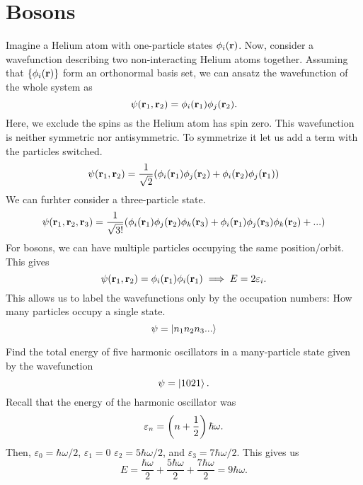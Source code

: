\section{Bosons}
    Imagine a Helium atom with one-particle states $\phi_i(\mathbf{r})$. Now, consider a wavefunction describing two non-interacting Helium atoms together. Assuming that $\{\phi_i(\mathbf{r})\}$ form an orthonormal basis set, we can ansatz the wavefunction of the whole system as
    \begin{equation}
        \psi(\mathbf{r}_1,\mathbf{r}_2)=\phi_i(\mathbf{r}_1)\phi_j(\mathbf{r}_2).
    \end{equation}
    Here, we exclude the spins as the Helium atom has spin zero. This wavefunction is neither symmetric nor antisymmetric. To symmetrize it let us add a term with the particles switched.
    \begin{equation}
        \psi(\mathbf{r}_1,\mathbf{r}_2)=\frac{1}{\sqrt{2}}(\phi_i(\mathbf{r}_1)\phi_j(\mathbf{r}_2)+\phi_i(\mathbf{r}_2)\phi_j(\mathbf{r}_1))
    \end{equation}
    We can furhter consider a three-particle state. 
    \begin{equation}
        \psi(\mathbf{r}_1,\mathbf{r}_2,\mathbf{r}_3) = \frac{1}{\sqrt{3!}}(\phi_i(\mathbf{r}_1)\phi_j(\mathbf{r}_2)\phi_k(\mathbf{r}_3)+\phi_i(\mathbf{r}_1)\phi_j(\mathbf{r}_3)\phi_k(\mathbf{r}_2)+...)
    \end{equation}
    For bosons, we can have multiple particles occupying the same position/orbit. This gives
    \begin{equation}
        \psi(\mathbf{r}_1,\mathbf{r}_2)=\phi_i(\mathbf{r}_1)\phi_i(\mathbf{r}_1) \implies E = 2\varepsilon_i.
    \end{equation}
    This allows us to label the wavefunctions only by the occupation numbers: How many particles occupy a single state.
    \begin{equation}
        \psi = \left| n_1n_2n_3... \right>
    \end{equation}
    \begin{problem}{Find the total energy of five harmonic oscillators in a many-particle state given by the wavefunction 
    \begin{equation}
        \psi = \left| 1021 \right>.
    \end{equation}
    }
    Recall that the energy of the harmonic oscillator was
    \begin{equation}
        \varepsilon_n = \left( n+\frac{1}{2} \right)\hbar\omega.
    \end{equation}
    Then, $\varepsilon_0=\hbar\omega/2$, $\varepsilon_1=0$ $\varepsilon_2=5\hbar\omega/2$, and $\varepsilon_3 = 7\hbar\omega/2$. This gives us
    \begin{equation}
        E = \frac{\hbar\omega}{2} + \frac{5\hbar\omega}{2} + \frac{7\hbar\omega}{2} = 9\hbar\omega.
    \end{equation}
    \end{problem}
